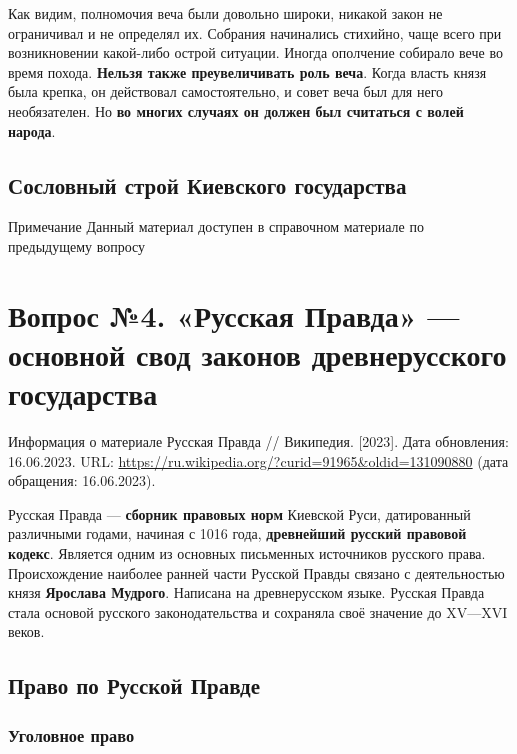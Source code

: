 \documentclass{article}
\begin{document}
\hfill

Как видим, полномочия веча были довольно широки, никакой закон не ограничивал и не определял их. Собрания начинались стихийно, чаще всего при возникновении какой-либо острой ситуации. Иногда ополчение собирало вече во время похода. \textbf{Нельзя также преувеличивать роль веча}. Когда власть князя была крепка, он действовал самостоятельно, и совет веча был для него необязателен. Но \textbf{во многих случаях он должен был считаться с волей народа}.

\subsection{Сословный строй Киевского государства}

\begin{bclogo}[logo=\bcinfo, couleurBarre=orange, noborder=true, couleur=white]{Примечание}
    Данный материал доступен в справочном материале по предыдущему вопросу
\end{bclogo}

\pagebreak
\section{Вопрос №4. «Русская Правда» — основной свод законов древнерусского государства}

\begin{bclogo}[logo=\bcinfo, couleurBarre=orange, noborder=true, couleur=white]{Информация о материале}
    Русская Правда // Википедия. [2023]. Дата обновления: 16.06.2023. URL: \url{https://ru.wikipedia.org/?curid=91965&oldid=131090880} (дата обращения: 16.06.2023).
\end{bclogo}

Русская Правда — \textbf{сборник правовых норм} Киевской Руси, датированный различными годами, начиная с 1016 года, \textbf{древнейший русский правовой кодекс}. Является одним из основных письменных источников русского права. Происхождение наиболее ранней части Русской Правды связано с деятельностью князя \textbf{Ярослава Мудрого}. Написана на древнерусском языке. Русская Правда стала основой русского законодательства и сохраняла своё значение до XV—XVI веков.

\subsection{Право по Русской Правде}

\subsubsection{Уголовное право}
\end{document}
